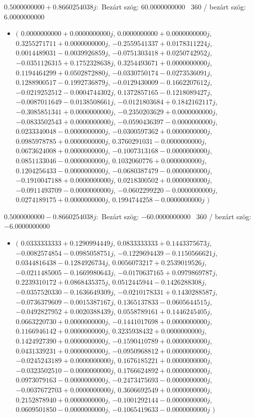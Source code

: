 \documentclass[14pt,a4paper]{article}
\begin{document}
$0.5000000000+0.8660254038j$:\
Bezárt szög: $60.0000000000$ \
360 / bezárt szög: $6.0000000000$\
\begin{itemize}
\item
$\big($
$0.0000000000+0.0000000000j$, $0.0000000000+0.0000000000j$, $0.3255271711+0.0000000000j$, $-0.2559541337+0.0178311224j$, $0.0014489031-0.0039926859j$, $-0.0751303418+0.0250742952j$, $-0.0351126315+0.1752328638j$, $0.3254493671+0.0000000000j$, $0.1194464299+0.0502872880j$, $-0.0330750174-0.0273536091j$, $0.1288900517-0.1992736879j$, $-0.0129430009-0.1662207612j$, $-0.0219252512-0.0004744302j$, $0.1372857165-0.1218089427j$, $-0.0087011649-0.0138508661j$, $-0.0121803684+0.1842162117j$, $-0.3085851341+0.0000000000j$, $-0.2350203629+0.0000000000j$, $-0.0833502543+0.0000000000j$, $-0.0590436397-0.0000000000j$, $0.0233340048-0.0000000000j$, $-0.0300597362+0.0000000000j$, $0.0985978785+0.0000000000j$, $0.3760291031-0.0000000000j$, $0.0673624008+0.0000000000j$, $-0.1007313168-0.0000000000j$, $0.0851133046-0.0000000000j$, $0.1032060776+0.0000000000j$, $0.1204256433-0.0000000000j$, $-0.0680387479-0.0000000000j$, $-0.1910047188+0.0000000000j$, $0.0218300502+0.0000000000j$, $-0.0911493709-0.0000000000j$, $-0.0602299220-0.0000000000j$, $0.0274189175+0.0000000000j$, $0.1994744258-0.0000000000j$
$\big)$
\end{itemize}
$0.5000000000-0.8660254038j$:\
Bezárt szög: $-60.0000000000$ \
360 / bezárt szög: $-6.0000000000$\
\begin{itemize}
\item
$\big($
$0.0333333333+0.1290994449j$, $0.0833333333+0.1443375673j$, $-0.0082574854-0.0985058751j$, $-0.1229694439-0.1150566621j$, $0.0344816438-0.1284926734j$, $0.0056073217+0.2539019526j$, $-0.0211485005-0.1669980643j$, $-0.0170637165+0.0979869787j$, $0.2239310172+0.0868435375j$, $0.0512445944-0.1426288308j$, $-0.0357520330-0.1636649309j$, $-0.0210178331+0.1430288587j$, $-0.0736379609-0.0015387167j$, $0.1365137833-0.0605644515j$, $-0.0492827952+0.0020388439j$, $0.0558789161+0.1446245405j$, $0.0663220730+0.0000000000j$, $-0.1441017698+0.0000000000j$, $0.1166946142+0.0000000000j$, $0.3235938432+0.0000000000j$, $0.1424927390+0.0000000000j$, $-0.1590410789+0.0000000000j$, $0.0431339231+0.0000000000j$, $-0.0950968812+0.0000000000j$, $-0.0245243189+0.0000000000j$, $0.1676185221+0.0000000000j$, $-0.0323502510-0.0000000000j$, $0.1766624892+0.0000000000j$, $0.0973079163-0.0000000000j$, $-0.2473475693-0.0000000000j$, $-0.0037672703+0.0000000000j$, $0.3606692549+0.0000000000j$, $0.2152878940+0.0000000000j$, $-0.1001292144-0.0000000000j$, $0.0609501850-0.0000000000j$, $-0.1065419633-0.0000000000j$
$\big)$
\end{itemize}
\end{document}
